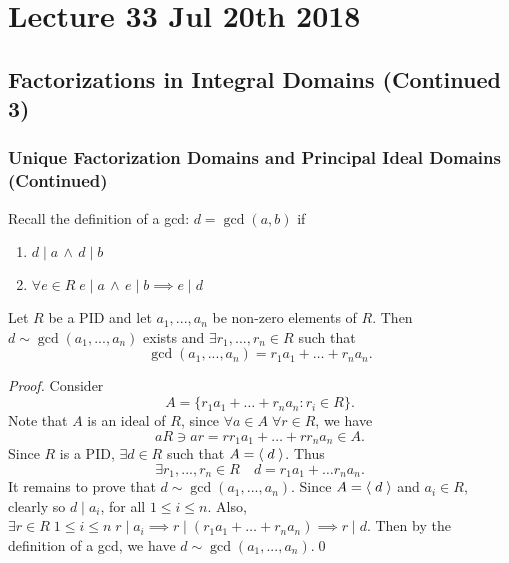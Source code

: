 \chapter{Lecture 33 Jul 20th 2018}%
\label{chp:lecture_33_jul_20th_2018}

\section{Factorizations in Integral Domains (Continued 3)}%
\label{sec:factorizations_in_integral_domains_continued_3}

\subsection{Unique Factorization Domains and Principal Ideal Domains (Continued)}%
\label{sub:unique_factorization_domains_and_principal_ideal_domains_continued}

\begin{note}
  Recall the definition of a gcd: $d = \gcd(a, b)$ if
  \begin{enumerate}
    \item $d \mid a \, \land \, d \mid b$
    \item $\forall e \in R \; e \mid a \, \land \, e \mid b \implies e \mid d$
  \end{enumerate}
\end{note}

\begin{propo}
\label{propo:bezout_s_lemma_in_pids}
  Let $R$ be a PID and let $a_1, ..., a_n$ be non-zero elements of $R$. Then $d \sim \gcd(a_1, ..., a_n)$ exists and $\exists r_1, ..., r_n \in R$ such that
  \begin{equation*}
    \gcd(a_1, ..., a_n) = r_1 a_1 + \hdots + r_n a_n.
  \end{equation*}
\end{propo}

\begin{proof}
  Consider
  \begin{equation*}
    A = \{ r_1 a_1 + \hdots + r_n a_n : r_i \in R \}.
  \end{equation*}
  Note that $A$ is an ideal of $R$, since $\forall a \in A \; \forall r \in R$, we have
  \begin{equation*}
    aR \ni ar = rr_1 a_1 + \hdots + rr_n a_n \in A.
  \end{equation*}
  Since $R$ is a PID, $\exists d \in R$ such that $A = \langle \; d \; \rangle$. Thus
  \begin{equation*}
    \exists r_1, ..., r_n \in R \quad d = r_1 a_1 + \hdots r_n a_n.
  \end{equation*}
  It remains to prove that $d \sim \gcd(a_1, ..., a_n)$. Since $A = \langle \; d \; \rangle$ and $a_i \in R$, clearly so $d \mid a_i$, for all $1 \leq i \leq n$. Also, $\exists r \in R \; 1 \leq i \leq n \; r \mid a_i \implies r \mid (r_1 a_1 + \hdots + r_n a_n) \implies r \mid d$. Then by the definition of a gcd, we have $d \sim \gcd(a_1, ..., a_n)$.\qed
\end{proof}

